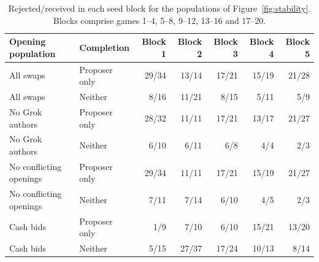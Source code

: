 \begin{table}[ht]\centering\small
\begin{tabular}{@{}llrrrrr@{}}\toprule
Opening population & Completion & Block 1 & Block 2 & Block 3 & Block 4 & Block 5\\\midrule
All swaps & Proposer only & 29/34 & 13/14 & 17/21 & 15/19 & 21/28 \\
All swaps & Neither & 8/16 & 11/21 & 8/15 & 5/11 & 5/9 \\
No Grok authors & Proposer only & 28/32 & 11/11 & 17/21 & 13/17 & 21/27 \\
No Grok authors & Neither & 6/10 & 6/11 & 6/8 & 4/4 & 2/3 \\
No conflicting openings & Proposer only & 29/34 & 11/11 & 17/21 & 15/19 & 21/27 \\
No conflicting openings & Neither & 7/11 & 7/14 & 6/10 & 4/5 & 2/3 \\
Cash bids & Proposer only & 1/9 & 7/10 & 6/10 & 15/21 & 13/20 \\
Cash bids & Neither & 5/15 & 27/37 & 17/24 & 10/13 & 8/14 \\
\bottomrule\end{tabular}
\caption{Rejected/received in each seed block for the populations of Figure~\ref{fig:stability}. Blocks comprise games 1--4, 5--8, 9--12, 13--16 and 17--20.}\label{tab:block-counts}
\end{table}
